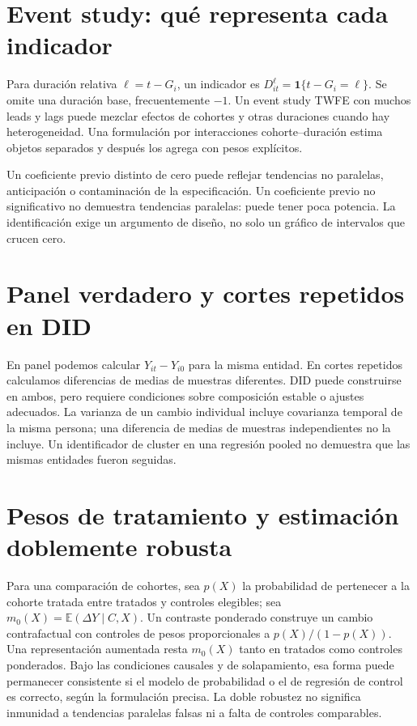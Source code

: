 \documentclass[11pt,a4paper]{article}
\newcommand{\E}{\mathbb E}
\newcommand{\ind}{\mathbf 1}
\theoremstyle{definition}
\begin{document}
\section{Event study: qué representa cada indicador}
Para duración relativa $\ell=t-G_i$, un indicador es
$D_{it}^\ell=\ind\{t-G_i=\ell\}$.
Se omite una duración base, frecuentemente $-1$.
Un event study TWFE con muchos leads y lags puede mezclar efectos de cohortes y otras duraciones cuando hay heterogeneidad.
Una formulación por interacciones cohorte--duración estima objetos separados y después los agrega con pesos explícitos.

Un coeficiente previo distinto de cero puede reflejar tendencias no paralelas, anticipación o contaminación de la especificación. Un coeficiente previo no significativo no demuestra tendencias paralelas: puede tener poca potencia. La identificación exige un argumento de diseño, no solo un gráfico de intervalos que crucen cero.

\section{Panel verdadero y cortes repetidos en DID}
En panel podemos calcular $Y_{it}-Y_{i0}$ para la misma entidad. En cortes repetidos calculamos diferencias de medias de muestras diferentes.
DID puede construirse en ambos, pero requiere condiciones sobre composición estable o ajustes adecuados.
La varianza de un cambio individual incluye covarianza temporal de la misma persona; una diferencia de medias de muestras independientes no la incluye.
Un identificador de cluster en una regresión pooled no demuestra que las mismas entidades fueron seguidas.

\section{Pesos de tratamiento y estimación doblemente robusta}
Para una comparación de cohortes, sea $p(X)$ la probabilidad de pertenecer a la cohorte tratada entre tratados y controles elegibles; sea $m_0(X)=\E(\Delta Y\mid C,X)$.
Un contraste ponderado construye un cambio contrafactual con controles de pesos proporcionales a $p(X)/(1-p(X))$.
Una representación aumentada resta $m_0(X)$ tanto en tratados como controles ponderados. Bajo las condiciones causales y de solapamiento, esa forma puede permanecer consistente si el modelo de probabilidad o el de regresión de control es correcto, según la formulación precisa.
La doble robustez no significa inmunidad a tendencias paralelas falsas ni a falta de controles comparables.
\end{document}
